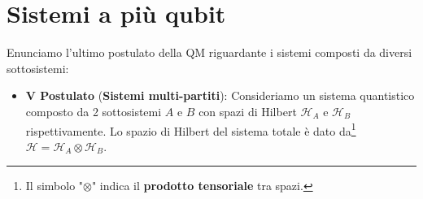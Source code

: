 \vspace{1.0cm}

\noindent{}

\section{Sistemi a più qubit}

\noindent Enunciamo l'ultimo postulato della QM riguardante i sistemi composti da diversi sottosistemi:
\begin{itemize}
    \item \textbf{V Postulato} (\textbf{Sistemi multi-partiti}): Consideriamo un sistema quantistico composto da 2 sottosistemi $A$ e $B$ con spazi di Hilbert $\mathcal{H}_A$ e $\mathcal{H}_B$ rispettivamente. Lo spazio di Hilbert del sistema totale è dato da\footnote{Il simbolo "$\otimes$" indica il \textbf{prodotto tensoriale} tra spazi.} $\mathcal{H} = \mathcal{H}_A \otimes \mathcal{H}_B$.
\end{itemize}

